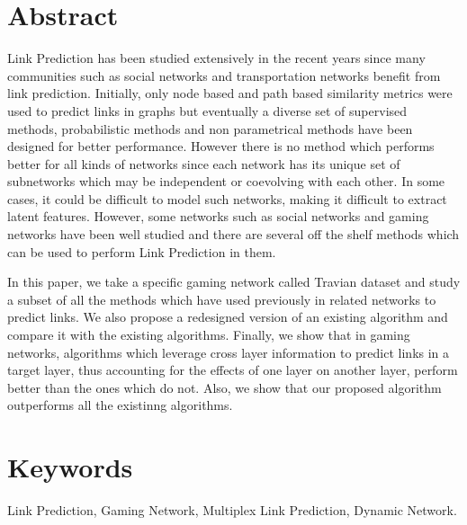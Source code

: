 \section{Abstract}
\label{sec:abstract}

Link Prediction has been studied extensively in the recent years since many
communities such as  social networks and transportation networks benefit from
link prediction. Initially, only node based and path based similarity metrics
were used to predict links in graphs but eventually a diverse set of
supervised methods, probabilistic methods and non parametrical methods have
been designed for better performance. However there is no method which
performs better for all kinds of networks since each network has its unique set of
subnetworks which may be independent  or coevolving with each other. In some
cases, it could be difficult to model such networks,  making it
difficult to extract latent features. However, some networks such as social
networks and gaming  networks have been well studied and there are several off
the shelf methods which can be used to perform Link Prediction in them. 

In this paper, we take a specific gaming network called Travian dataset and
study a subset of all the methods which have used previously in related
networks to predict links. We also propose a redesigned version of an existing
algorithm  and compare it with the existing algorithms. Finally, we show that
in gaming networks,  algorithms which leverage cross layer information to
predict links in a target layer, thus  accounting for the effects of one layer
on another layer, perform better than the ones which  do not. Also, we show
that our proposed algorithm outperforms all the existinng algorithms.

\section{Keywords}

Link Prediction, Gaming Network, Multiplex Link Prediction, Dynamic Network.


